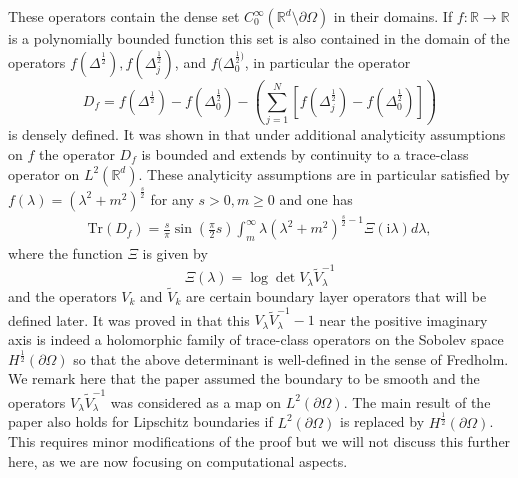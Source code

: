 These operators contain the dense set $C^\infty_0(\mathbb{R}^d \setminus \partial \Omega)$ in their domains.
If $f: \mathbb{R} \to \mathbb{R}$ is a polynomially bounded function this set is also contained in the domain of the operators
$f(\Delta^{\frac{1}{2}}), f(\Delta_{j}^{\frac{1}{2}})$, and $f(\Delta_{0}^{\frac{1}{2})}$, in particular the operator
$$
 D_{f} = f(\Delta^{\frac{1}{2}}) - f(\Delta_{0}^{\frac{1}{2}}) - \left(\sum_{j = 1}^{N}[f(\Delta_{j}^{\frac{1}{2}}) - f(\Delta_{0}^{\frac{1}{2}})]\right)
$$
is densely defined. It was shown in \cite{hanisch2020relative} that under additional analyticity assumptions on $f$ the operator
$D_{f}$ is bounded and extends by continuity to a trace-class operator on $L^2(\mathbb{R}^{d})$. 
These analyticity assumptions are in particular satisfied by $f(\lambda) = (\lambda^{2}+ m^{2})^{\frac{s}{2}}$ for any $s > 0, m \geq 0$ and one has
\begin{align}
    \text{Tr}\left( D_{f} \right)  = \frac{s}{\pi} \sin\left(\frac{\pi}{2} s\right) \int_{m}^{\infty} \lambda (\lambda^{2} + m^{2})^{\frac{s}{2}-1}\Xi(\mathrm{i} \lambda) d \lambda,
\end{align}
where the function $\Xi$ is given by
$$
 \Xi(\lambda) = \log \det V_{\lambda} \tilde V_{\lambda}^{-1}
$$
and the operators $V_{k}$ and $\tilde V_{k}$ are certain boundary layer operators that will be defined later. 
It was proved in  \cite{hanisch2020relative} that this $V_{\lambda} \tilde V_{\lambda}^{-1}-1$ near the positive imaginary axis is indeed a holomorphic family of trace-class operators on the Sobolev space $H^\frac{1}{2}(\partial \Omega)$  so that the above determinant is well-defined in the sense of Fredholm. We remark here that the paper \cite{hanisch2020relative} assumed the boundary to be smooth and the operators $V_\lambda  \tilde V_\lambda^{-1}$ was considered as a map on $L^2(\partial \Omega)$. The main result of the paper also holds for Lipschitz boundaries if $L^2(\partial \Omega)$ is replaced by $H^\frac{1}{2}(\partial \Omega)$. This requires minor modifications of the proof but we will not discuss this further here, as we are now focusing on computational aspects.


